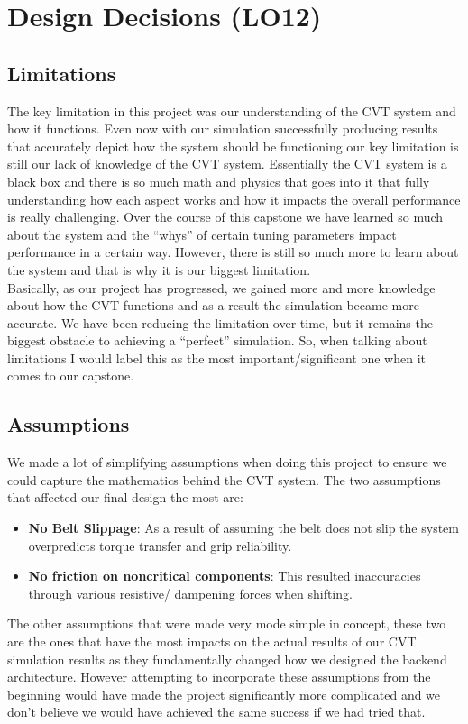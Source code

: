\documentclass{article}
\begin{document}
\section{Design Decisions (LO12)}

\subsection{Limitations}
The key limitation in this project was our understanding of the CVT system and how it functions. Even now with our simulation successfully producing results that accurately depict how the system should be functioning our key limitation is still our lack of knowledge of the CVT system. 
Essentially the CVT system is a black box and there is so much math and physics that goes into it that fully understanding how each aspect works and how it impacts the overall performance is really challenging. Over the course of this capstone we have learned so much about the system 
and the “whys” of certain tuning parameters impact performance in a certain way. However, there is still so much more to learn about the system and that is why it is our biggest limitation.\\
Basically, as our project has progressed, we gained more and more knowledge about how the CVT functions and as a result the simulation became more accurate. 
We have been reducing the limitation over time, but it remains the biggest obstacle to achieving a “perfect” simulation. So, when talking about limitations I would label this as the most important/significant one when it comes to our capstone. 

\subsection{Assumptions}
We made a lot of simplifying assumptions when doing this project to ensure we could capture the mathematics behind the CVT system. The two assumptions that affected our final design the most are:
\begin{itemize}
    \item \textbf{No Belt Slippage}: As a result of assuming the belt does not slip the system overpredicts torque transfer and grip reliability.
    \item \textbf{No friction on noncritical components}: This resulted inaccuracies through various resistive/ dampening forces when shifting.
\end{itemize}
The other assumptions that were made very mode simple in concept, these two are the ones that have the most impacts on the actual results of our CVT simulation results as they fundamentally changed how we designed the backend architecture. However attempting to incorporate these assumptions from the beginning would have made the project significantly more complicated and we don’t believe we would have achieved the same success if we had tried that. 
\end{document}
